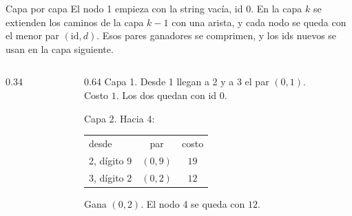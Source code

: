 \begin{frame}{Capa por capa}
  El nodo 1 empieza con la string vacía, id \(0\).
  En la capa \(k\) se extienden los caminos de la capa \(k-1\) con una arista, y cada nodo se queda con el menor par \((\mathrm{id}, d)\).
  Esos pares ganadores se comprimen, y los ids nuevos se usan en la capa siguiente.

  \vspace{0.45em}
  \begin{columns}[c,onlytextwidth]
    \begin{column}{0.34\textwidth}
      \centering
    \end{column}
    \begin{column}{0.64\textwidth}
      \footnotesize
      Capa 1. Desde 1 llegan a 2 y a 3 el par \((0,1)\).\\
      Costo \(1\). Los dos quedan con id \(0\).

      \medskip
      Capa 2. Hacia 4:
      \begin{center}
      \renewcommand{\arraystretch}{1.12}
      \begin{tabular}{@{}l@{\quad}c@{\quad}c@{}}
        desde & par & costo \\
        2, dígito 9 & \((0,9)\) & \(19\) \\
        3, dígito 2 & \((0,2)\) & \(12\)
      \end{tabular}
      \end{center}
      Gana \((0,2)\). El nodo 4 se queda con \(12\).
    \end{column}
  \end{columns}
\end{frame}

